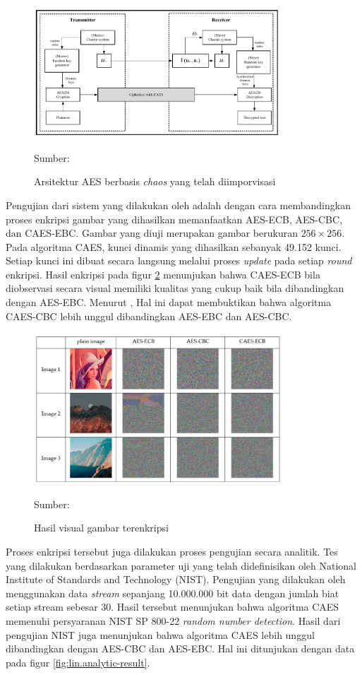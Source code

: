 \begin{figure}[!h]
  \centering
  \includegraphics[width=350px]{chapters/res/chapter-2/img/lin.caes.png}
  \caption{Arsitektur AES berbasis \emph{chaos} yang telah diimporvisasi} \label{fig:lin.caes}
  Sumber: \textcite{lin2021}
\end{figure}

Pengujian dari sistem yang dilakukan oleh \textcite{lin2021} adalah dengan cara membandingkan proses enkripsi gambar yang dihasilkan memanfaatkan AES-ECB, AES-CBC, dan CAES-EBC. Gambar yang diuji merupakan gambar berukuran $256 \times 256$. Pada algoritma CAES, kunci dinamis yang dihasilkan sebanyak 49.152 kunci. Setiap kunci ini dibuat secara langsung melalui proses \emph{update} pada setiap \emph{round} enkripsi. Hasil enkripsi pada figur \ref{fig:lin.result} menunjukan bahwa CAES-ECB bila diobservasi secara visual memiliki kualitas yang cukup baik bila dibandingkan dengan AES-EBC. Menurut \textcite{lin2021}, Hal ini dapat membuktikan bahwa algoritma CAES-CBC lebih unggul dibandingkan AES-EBC dan AES-CBC.

\begin{figure}[!h]
  \centering
  \includegraphics[width=350px]{chapters/res/chapter-2/img/lin.res.png}
  \caption{Hasil visual gambar terenkripsi} \label{fig:lin.result}
  Sumber: \textcite{lin2021}
\end{figure}

Proses enkripsi tersebut juga dilakukan proses pengujian secara analitik. Tes yang dilakukan berdasarkan parameter uji yang telah didefinisikan oleh National Institute of Standards and Technology (NIST). Pengujian yang dilakukan oleh \textcite{lin2021} menggunakan data \emph{stream} sepanjang 10.000.000 bit data dengan jumlah biat setiap stream sebesar 30. Hasil tersebut menunjukan bahwa algoritma CAES memenuhi persyaranan NIST SP 800-22 \emph{random number detection}. Hasil dari pengujian NIST juga menunjukan bahwa algoritma CAES lebih unggul dibandingkan dengan AES-CBC dan AES-EBC. Hal ini ditunjukan dengan data pada figur \ref{fig:lin.analytic-result}.

